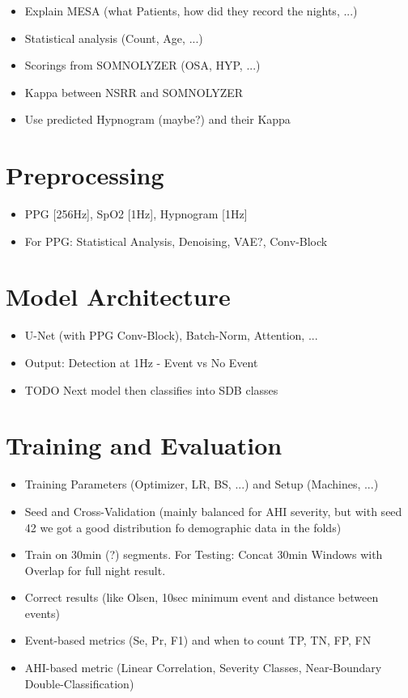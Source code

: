 \begin{itemize}
    \item Explain MESA (what Patients, how did they record the nights, ...)
    \item Statistical analysis (Count, Age, ...)
    \item Scorings from SOMNOLYZER (OSA, HYP, ...)
    \item Kappa between NSRR and SOMNOLYZER
    \item Use predicted Hypnogram (maybe?) and their Kappa
\end{itemize}

\section{Preprocessing}

\begin{itemize}
    \item PPG [256Hz], SpO2 [1Hz], Hypnogram [1Hz]
    \item For PPG: Statistical Analysis, Denoising, VAE?, Conv-Block
\end{itemize}

\section{Model Architecture}

\begin{itemize}
    \item U-Net (with PPG Conv-Block), Batch-Norm, Attention, ...
    \item Output: Detection at 1Hz - Event vs No Event
    \item TODO Next model then classifies into SDB classes
\end{itemize}

\section{Training and Evaluation}

\begin{itemize}
    \item Training Parameters (Optimizer, LR, BS, ...) and Setup (Machines, ...)
    \item Seed and Cross-Validation (mainly balanced for AHI severity, but with seed 42 we got a good distribution fo demographic data in the folds)
    \item Train on 30min (?) segments. For Testing: Concat 30min Windows with Overlap for full night result.
    \item Correct results (like Olsen, 10sec minimum event and distance between events)
    \item Event-based metrics (Se, Pr, F1) and when to count TP, TN, FP, FN
    \item AHI-based metric (Linear Correlation, Severity Classes, Near-Boundary Double-Classification)
\end{itemize}

